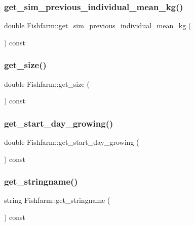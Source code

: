 \subsubsection{\texorpdfstring{get\_sim\_previous\_individual\_mean\_kg()}{get\_sim\_previous\_individual\_mean\_kg()}}
{\footnotesize\ttfamily double Fishfarm\+::get\+\_\+sim\+\_\+previous\+\_\+individual\+\_\+mean\+\_\+kg (\begin{DoxyParamCaption}{ }\end{DoxyParamCaption}) const}

\mbox{\label{class_fishfarm_a088aaa3fec52698b60ee9f418ffc3b38}} 
\subsubsection{\texorpdfstring{get\_size()}{get\_size()}}
{\footnotesize\ttfamily double Fishfarm\+::get\+\_\+size (\begin{DoxyParamCaption}{ }\end{DoxyParamCaption}) const}

\mbox{\label{class_fishfarm_a1d00b6c519f683c07d12334f9e733b49}} 
\subsubsection{\texorpdfstring{get\_start\_day\_growing()}{get\_start\_day\_growing()}}
{\footnotesize\ttfamily double Fishfarm\+::get\+\_\+start\+\_\+day\+\_\+growing (\begin{DoxyParamCaption}{ }\end{DoxyParamCaption}) const}

\mbox{\label{class_fishfarm_a7292eee3273126c23009d5dec596cc68}} 
\subsubsection{\texorpdfstring{get\_stringname()}{get\_stringname()}}
{\footnotesize\ttfamily string Fishfarm\+::get\+\_\+stringname (\begin{DoxyParamCaption}{ }\end{DoxyParamCaption}) const}

